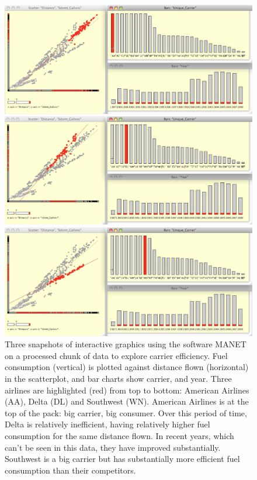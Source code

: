 \documentclass[11pt]{article}
\begin{document}
\begin{figure}[!htp]
\centerline{\includegraphics[width=5in]{images/airline-manet1.png}}
\smallskip
\centerline{\includegraphics[width=5in]{images/airline-manet2.png}}
\smallskip
\centerline{\includegraphics[width=5in]{images/airline-manet3.png}}
\caption{Three snapshots of interactive graphics using the software MANET on a processed chunk of data to explore carrier efficiency. Fuel consumption (vertical) is plotted against distance flown (horizontal) in the scatterplot, and bar charts show carrier, and year. Three airlines are highlighted (red) from top to bottom: American Airlines (AA), Delta (DL) and Southwest (WN). American Airlines is at the top of the pack: big carrier, big consumer. Over this period of time, Delta is relatively inefficient, having relatively higher fuel consumption for the same distance flown. In recent years, which can't be seen in this data, they have improved substantially. Southwest is a big carrier but has substantially more efficient fuel consumption than their competitors.}
\label{carrier-efficiency}
\end{figure}
\end{document}
